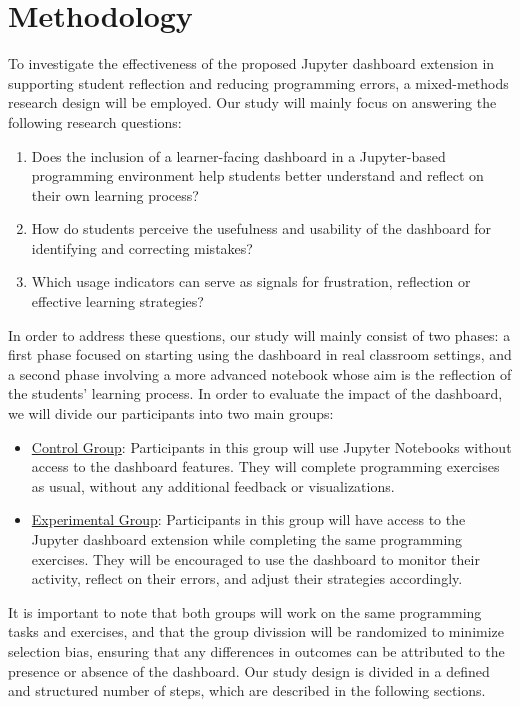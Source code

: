 \section{Methodology}

To investigate the effectiveness of the proposed Jupyter dashboard extension in supporting student reflection and reducing programming errors, a mixed-methods research design will be employed. Our study will mainly focus on answering the following research questions:
\begin{enumerate}
    \item[RQ1:] Does the inclusion of a learner-facing dashboard in a Jupyter-based programming environment help students better understand and reflect on their own learning process?
    \item[RQ2:] How do students perceive the usefulness and usability of the dashboard for identifying and correcting mistakes?
    \item[RQ3:] Which usage indicators can serve as signals for frustration, reflection or effective learning strategies?
\end{enumerate}

In order to address these questions, our study will mainly consist of two phases: a first phase focused on starting using the dashboard in real classroom settings, and a second phase involving a more advanced notebook whose aim is the reflection of the students' learning process. In order to evaluate the impact of the dashboard, we will divide our participants into two main groups:
\begin{itemize}
    \item \underline{Control Group}: Participants in this group will use Jupyter Notebooks without access to the dashboard features. They will complete programming exercises as usual, without any additional feedback or visualizations.
    \item \underline{Experimental Group}: Participants in this group will have access to the Jupyter dashboard extension while completing the same programming exercises. They will be encouraged to use the dashboard to monitor their activity, reflect on their errors, and adjust their strategies accordingly.
\end{itemize}

It is important to note that both groups will work on the same programming tasks and exercises, and that the group divission will be randomized to minimize selection bias, ensuring that any differences in outcomes can be attributed to the presence or absence of the dashboard. Our study design is divided in a defined and structured number of steps, which are described in the following sections.

